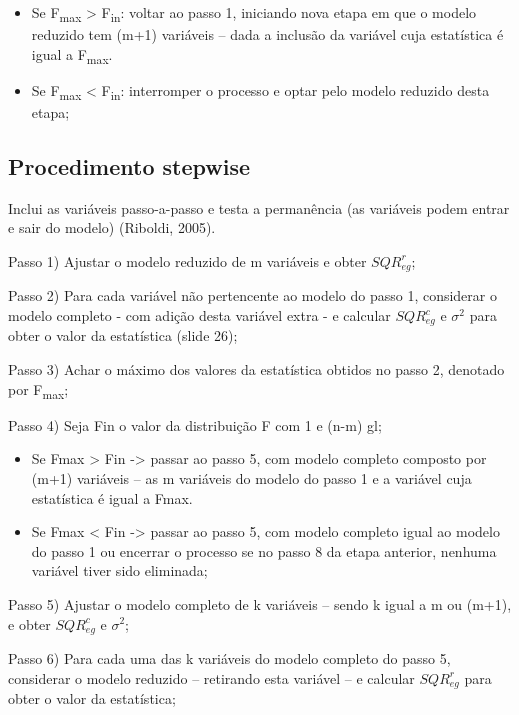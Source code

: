 \documentclass[12pt,brazil,]{book}
\begin{document}
\begin{itemize}
\item
  Se F\textsubscript{max} \textgreater{} F\textsubscript{in}: voltar ao
  passo 1, iniciando nova etapa em que o modelo reduzido tem (m+1)
  variáveis -- dada a inclusão da variável cuja estatística é igual a
  F\textsubscript{max}.
\item
  Se F\textsubscript{max} \textless{} F\textsubscript{in}: interromper o
  processo e optar pelo modelo reduzido desta etapa;
\end{itemize}

\hypertarget{procedimento-stepwise}{%
\subsection{Procedimento stepwise}\label{procedimento-stepwise}}

Inclui as variáveis passo-a-passo e testa a permanência (as variáveis
podem entrar e sair do modelo) (Riboldi, 2005).

Passo 1) Ajustar o modelo reduzido de m variáveis e obter
\(SQR^{r}_{eg}\);

Passo 2) Para cada variável não pertencente ao modelo do passo 1,
considerar o modelo completo - com adição desta variável extra - e
calcular \(SQR^{c}_{eg}\) e \(\sigma^{2}\) para obter o valor da
estatística (slide 26);

Passo 3) Achar o máximo dos valores da estatística obtidos no passo 2,
denotado por F\textsubscript{max};

Passo 4) Seja Fin o valor da distribuição F com 1 e (n-m) gl;

\begin{itemize}
\item
  Se Fmax \textgreater{} Fin -\textgreater{} passar ao passo 5, com
  modelo completo composto por (m+1) variáveis -- as m variáveis do
  modelo do passo 1 e a variável cuja estatística é igual a Fmax.
\item
  Se Fmax \textless{} Fin -\textgreater{} passar ao passo 5, com modelo
  completo igual ao modelo do passo 1 ou encerrar o processo se no passo
  8 da etapa anterior, nenhuma variável tiver sido eliminada;
\end{itemize}

Passo 5) Ajustar o modelo completo de k variáveis -- sendo k igual a m
ou (m+1), e obter \(SQR^{c}_{eg}\) e \(\sigma^{2}\);

Passo 6) Para cada uma das k variáveis do modelo completo do passo 5,
considerar o modelo reduzido -- retirando esta variável -- e calcular
\(SQR^{r}_{eg}\) para obter o valor da estatística;
\end{document}

